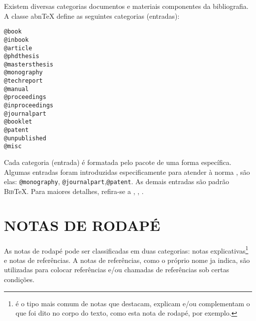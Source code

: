Existem diversas categorias documentos e materiais componentes da bibliografia. A classe abn\TeX{} define as seguintes categorias (entradas):

\begin{verbatim}
@book
@inbook
@article
@phdthesis
@mastersthesis
@monography
@techreport
@manual
@proceedings
@inproceedings
@journalpart
@booklet
@patent
@unpublished
@misc
\end{verbatim}

Cada categoria (entrada) é formatada pelo pacote  de uma forma específica. Algumas entradas foram introduzidas especificamente para atender à norma , são elas: \verb|@monography|, \verb|@journalpart|,\verb|@patent|. As demais entradas são padrão \textsc{Bib}\TeX{}. Para maiores detalhes, refira-se a , , .

\chapter{NOTAS DE RODAPÉ}
\label{chap:notasRodape}

As notas de rodapé pode ser classificadas em duas categorias: notas explicativas\footnote{é o tipo mais comum de notas que destacam, explicam e/ou complementam o que foi dito no corpo do texto, como esta nota de rodapé, por exemplo.} e notas de referências. A notas de referências, como o próprio nome ja indica, são utilizadas para colocar referências e/ou chamadas de referências sob certas condições.

